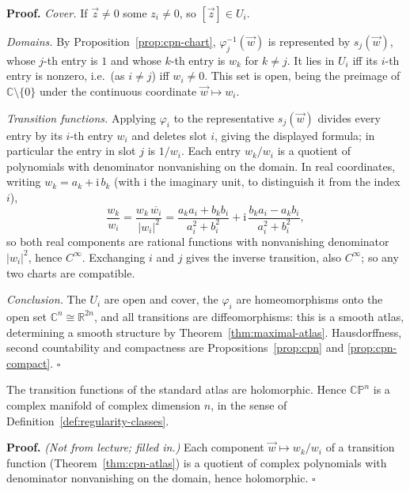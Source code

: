 \documentclass[11pt]{report}
\makeatletter
\newcounter{thmcounter}[section]
\renewenvironment{proof}[1][Proof]{\noindent\textbf{#1.} }{\hfill$\square$\par\vspace{5pt}}
\newcommand{\thmlabel}[1]{\edef\@currentlabel{\arabic{section}.\arabic{thmcounter}}\label{#1}}
\makeatother
\begin{document}
\begin{proof}
\emph{Cover.} If $\vec z \neq 0$ some $z_i \neq 0$, so $[\vec z] \in U_i$.

\emph{Domains.} By Proposition~\ref{prop:cpn-chart}, $\varphi_j^{-1}(\vec w)$ is represented by $s_j(\vec w)$, whose $j$-th entry is $1$ and whose $k$-th entry is $w_k$ for $k \neq j$. It lies in $U_i$ iff its $i$-th entry is nonzero, i.e.\ (as $i \neq j$) iff $w_i \neq 0$. This set is open, being the preimage of $\mathbb{C}\setminus\{0\}$ under the continuous coordinate $\vec w \mapsto w_i$.

\emph{Transition functions.} Applying $\varphi_i$ to the representative $s_j(\vec w)$ divides every entry by its $i$-th entry $w_i$ and deletes slot $i$, giving the displayed formula; in particular the entry in slot $j$ is $1/w_i$. Each entry $w_k/w_i$ is a quotient of polynomials with denominator nonvanishing on the domain. In real coordinates, writing $w_k = a_k + \mathrm{i}\,b_k$ (with $\mathrm{i}$ the imaginary unit, to distinguish it from the index $i$),
\[
\frac{w_k}{w_i} = \frac{w_k\,\overline{w_i}}{|w_i|^2} = \frac{a_k a_i + b_k b_i}{a_i^2 + b_i^2} + \mathrm{i}\,\frac{b_k a_i - a_k b_i}{a_i^2 + b_i^2},
\]
so both real components are rational functions with nonvanishing denominator $|w_i|^2$, hence $C^\infty$. Exchanging $i$ and $j$ gives the inverse transition, also $C^\infty$; so any two charts are compatible.

\emph{Conclusion.} The $U_i$ are open and cover, the $\varphi_i$ are homeomorphisms onto the open set $\mathbb{C}^n \cong \mathbb{R}^{2n}$, and all transitions are diffeomorphisms: this is a smooth atlas, determining a smooth structure by Theorem~\ref{thm:maximal-atlas}. Hausdorffness, second countability and compactness are Propositions~\ref{prop:cpn} and \ref{prop:cpn-compact}.
\end{proof}

\begin{corbox}\thmlabel{cor:cpn-complex}
The transition functions of the standard atlas are holomorphic. Hence $\mathbb{CP}^n$ is a complex manifold of complex dimension $n$, in the sense of Definition~\ref{def:regularity-classes}.
\end{corbox}

\begin{proof}
\textit{(Not from lecture; filled in.)} Each component $\vec w \mapsto w_k/w_i$ of a transition function (Theorem~\ref{thm:cpn-atlas}) is a quotient of complex polynomials with denominator nonvanishing on the domain, hence holomorphic.
\end{proof}
\end{document}
